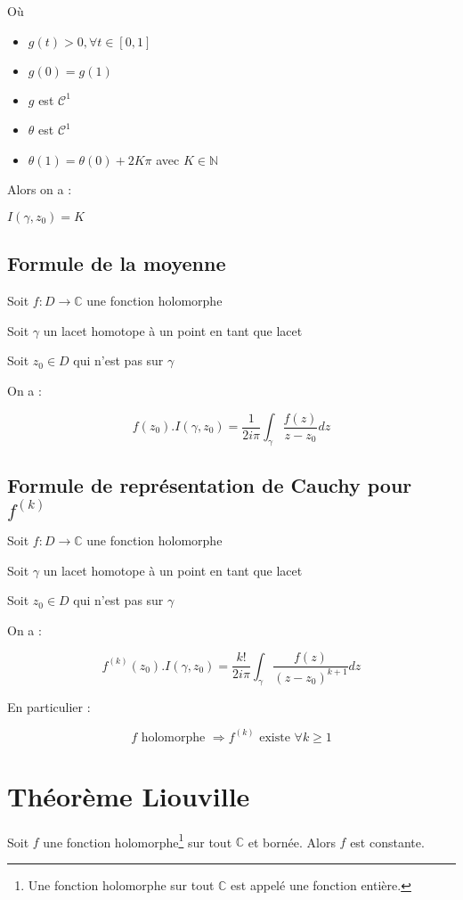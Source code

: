 \documentclass[a4paper,10pt]{report}
\newcommand{\ap}{\rightarrow}
\newcommand{\C}{\mathbb{C}}
\newcommand{\N}{\mathbb{N}}
\newcommand{\so}{\Rightarrow}
\begin{document}
Où
\begin{itemize}
\item{$g(t)>0, \forall t \in [0,1]$}
\item{$g(0) = g(1)$}
\item{$g $ est $\mathcal{C}^1$}
\item{$\theta$ est $\mathcal{C}^1$}
\item{$\theta(1) = \theta(0) + 2K\pi$ avec $K \in \N$}
\end{itemize}

Alors on a :

$I(\gamma,z_0) = K$

\subsection{Formule de la moyenne}

Soit $f: D \ap \C$ une fonction holomorphe

Soit $\gamma$ un lacet homotope à un point en tant que lacet

Soit $z_0 \in D$ qui n'est pas sur $\gamma$

On a :

\[f(z_0).I(\gamma,z_0) = \frac{1}{2i\pi} \int_\gamma \frac{f(z)}{z-z_0} dz \]

\subsection{Formule de représentation de Cauchy pour $f^{(k)}$}

Soit $f: D \ap \C$ une fonction holomorphe

Soit $\gamma$ un lacet homotope à un point en tant que lacet

Soit $z_0 \in D$ qui n'est pas sur $\gamma$

On a :

\[ f^{(k)}(z_0).I(\gamma,z_0) = \frac{k!}{2i\pi} \int_\gamma \frac{f(z)}{(z-z_0)^{k+1}} dz \]

En particulier :

\[f \mbox{ holomorphe } \so f^{(k)} \mbox{ existe } \forall k \geq 1 \]

\section{Théorème Liouville}
Soit $f$ une fonction holomorphe\footnote{Une fonction holomorphe sur tout
$\C$ est appelé une fonction entière.} sur tout $\C$ et bornée. Alors $f$
est constante.
\end{document}
